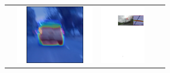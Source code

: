 \setlength{\tabcolsep}{0.25ex}

\begin{tabular}
{c cccc}
& \includegraphics[trim={2cm 0cm 2cm 0cm},clip,height = 1in]{img/fail/03249}
& \includegraphics[trim={10cm 18.5cm 0.5cm 4.3cm},clip,height = 1in]{img/fail/merge}
\\


\end{tabular}
